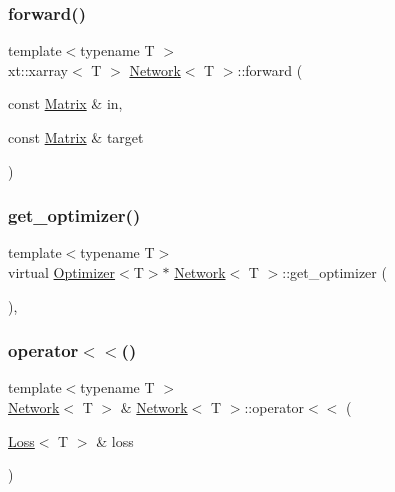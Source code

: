 \mbox{\label{class_network_aff4e815a38ab13b083676bef1b8ff1a9}} 
\subsubsection{\texorpdfstring{forward()}{forward()}}
{\footnotesize\ttfamily template$<$typename T $>$ \\
xt\+::xarray$<$ T $>$ \mbox{\hyperlink{class_network}{Network}}$<$ T $>$\+::forward (\begin{DoxyParamCaption}\item[{const \mbox{\hyperlink{class_network_a3217727df6a4bde68fb686293258d7f6}{Matrix}} \&}]{in,  }\item[{const \mbox{\hyperlink{class_network_a3217727df6a4bde68fb686293258d7f6}{Matrix}} \&}]{target }\end{DoxyParamCaption})\hspace{0.3cm}{\ttfamily [virtual]}}

\mbox{\label{class_network_aca741bb11b2d6070727d7bc306e2acfc}} 
\subsubsection{\texorpdfstring{get\_optimizer()}{get\_optimizer()}}
{\footnotesize\ttfamily template$<$typename T$>$ \\
virtual \mbox{\hyperlink{class_optimizer}{Optimizer}}$<$T$>$$\ast$ \mbox{\hyperlink{class_network}{Network}}$<$ T $>$\+::get\+\_\+optimizer (\begin{DoxyParamCaption}{ }\end{DoxyParamCaption})\hspace{0.3cm}{\ttfamily [inline]}, {\ttfamily [virtual]}}

\mbox{\label{class_network_aa31b66b394dd1221a8c090dc21a87de8}} 
\subsubsection{\texorpdfstring{operator$<$$<$()}{operator<<()}\hspace{0.1cm}{\footnotesize\ttfamily [1/4]}}
{\footnotesize\ttfamily template$<$typename T $>$ \\
\mbox{\hyperlink{class_network}{Network}}$<$ T $>$ \& \mbox{\hyperlink{class_network}{Network}}$<$ T $>$\+::operator$<$$<$ (\begin{DoxyParamCaption}\item[{\mbox{\hyperlink{class_loss}{Loss}}$<$ T $>$ \&}]{loss }\end{DoxyParamCaption})}

